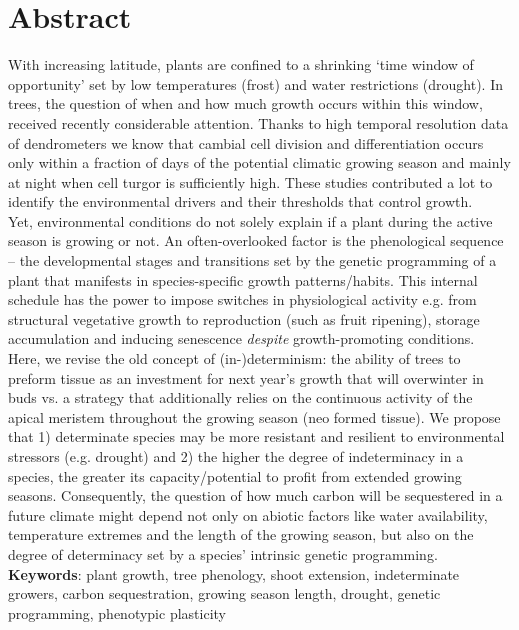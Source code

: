 \documentclass{article}
\begin{document}
	
	

	
\section*{Abstract} %
		With increasing latitude, plants are confined to a shrinking ‘time window of opportunity’ set by low temperatures (frost) and water restrictions (drought). In trees, the question of when and how much growth occurs within this window, received recently considerable attention. Thanks to high temporal resolution data of dendrometers we know that cambial cell division and differentiation occurs only within a fraction of days of the potential climatic growing season and mainly at night when cell turgor is sufficiently high. These studies contributed a lot to identify the environmental drivers and their thresholds that control growth. \\
		Yet, environmental conditions do not solely explain if a plant during the active season is growing or not. An often-overlooked factor is the phenological sequence – the developmental stages and transitions set by the genetic programming of a plant that manifests in species-specific growth patterns/habits. This internal schedule has the power to impose switches in physiological activity e.g. from structural vegetative growth to reproduction (such as fruit ripening), storage accumulation and inducing senescence \textit{despite} growth-promoting conditions.\\
		Here, we revise the old concept of (in-)determinism: the ability of trees to preform tissue as an investment for next year’s growth that will overwinter in buds vs. a strategy that additionally relies on the continuous activity of the apical meristem throughout the growing season (neo formed tissue). We propose that 1) determinate species may be more resistant and resilient to environmental stressors (e.g. drought) and 2) the higher the degree of indeterminacy in a species, the greater its capacity/potential to profit from extended growing seasons. Consequently, the question of how much carbon will be sequestered in a future climate might depend not only on abiotic factors like water availability, temperature extremes and the length of the growing season, but also on the degree of determinacy set by a species' intrinsic genetic programming.\\
		
			\textbf{Keywords}: plant growth, tree phenology, shoot extension, indeterminate growers, carbon sequestration, growing season length, drought, genetic programming, phenotypic plasticity
			\newpage
	
\end{document}
